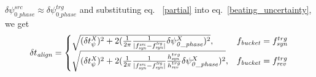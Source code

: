 \begin{itemize}
$\delta \psi^{src}_\mathit{0\_phase}\approx\delta \psi^{trg}_\mathit{0\_phase}$ and substituting eq. ~\ref{partial} into eq.~\ref{beating_uncertainty}, we get 
\begin{eqnarray}
\delta t_\mathit{align}=
\begin{cases}
\sqrt {(\delta t_\psi^\mathit{X})^2 +2(\frac{1}{2\pi}\frac{1}{|f_{\mathit{syn}}^\mathit{src}-f_{\mathit{syn}}^\mathit{trg}|} \delta \psi^{X}_\mathit{0\_phase})^2 }, &f_{\mathit{bucket}}=f_{\mathit{syn}}^{trg}\cr
\sqrt {(\delta t_\psi^\mathit{X})^2 +2(\frac{1}{2\pi}\frac{1}{|f_{\mathit{syn}}^\mathit{src}-f_{\mathit{syn}}^\mathit{trg}|} \frac{h_{\mathit{syn}}^{trg}}{h_{\mathit{rev}}^{trg}}\delta \psi^{X}_\mathit{0\_phase})^2 }, &f_{\mathit{bucket}}=f_{\mathit{rev}}^{trg}\cr
\end{cases}
\end{eqnarray}


\end{itemize}

